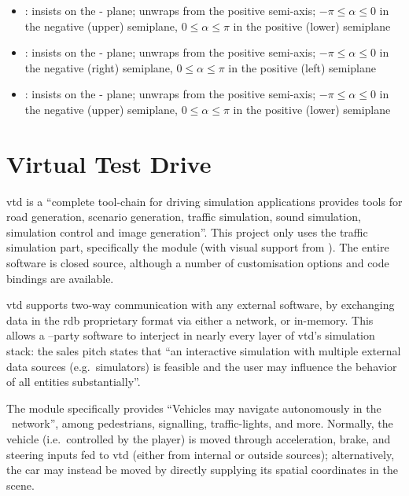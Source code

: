 \begin{itemize}
	\item {}: insists on the - plane; unwraps from the positive  semi-axis; $-\pi \leqslant \alpha \leqslant 0$ in the negative (upper) semiplane, $0 \leqslant \alpha \leqslant \pi$ in the positive (lower) semiplane
	\item {}: insists on the - plane; unwraps from the positive  semi-axis; $-\pi \leqslant \alpha \leqslant 0$ in the negative (right) semiplane, $0 \leqslant \alpha \leqslant \pi$ in the positive (left) semiplane
	\item {}: insists on the - plane; unwraps from the positive  semi-axis; $-\pi \leqslant \alpha \leqslant 0$ in the negative (upper) semiplane, $0 \leqslant \alpha \leqslant \pi$ in the positive (lower) semiplane
\end{itemize}

\section{Virtual Test Drive}\label{sc:software:vtd}

\acrfull{vtd} is a \enquote{complete tool-chain for driving simulation applications \FONTnormal{[that]} provides tools for road generation, scenario generation, traffic simulation, sound simulation, simulation control and image generation}{\cite{software:vtd}}. This project only uses the traffic simulation part, specifically the  module (with visual support from ). The entire software is closed source, although a number of customisation options and code bindings are available.

\gls{vtd} supports two-way communication with any external software, by exchanging data in the \gls{rdb} proprietary format via either a network, or in-memory. This allows a --party software to interject in nearly every layer of \gls{vtd}'s simulation stack: the sales pitch states that \enquote{an interactive simulation with multiple external data sources (e.g.\ simulators) is feasible and the user may influence the behavior of all entities substantially}{\cite{software:vtraffic}}.

The  module specifically provides \enquote{Vehicles \FONTnormal{[that]} may navigate autonomously in the \CHARomissis\ network}{\cite{software:vtraffic}}, among pedestrians, signalling, traffic-lights, and more. Normally, the  vehicle (i.e.\ controlled by the player) is moved through acceleration, brake, and steering inputs fed to \gls{vtd} (either from internal or outside sources); alternatively, the  car may instead be moved by directly supplying its spatial coordinates in the scene.

